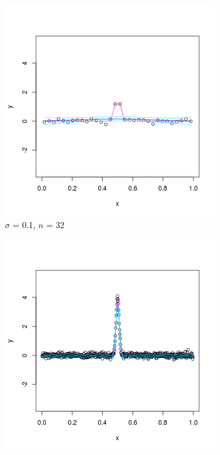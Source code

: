 \documentclass[11pt]{article}
\begin{document}
\begin{homeworkProblem}
    \begin{figure}[!ht]
        \begin{subfigure}{0.5\textwidth}
            \begin{centering}
                \includegraphics[width=\linewidth]{pointy_sig01_n32.png}
                \caption{$\sigma$ = 0.1, $n$ = 32}
            \end{centering}
        \end{subfigure}
        \begin{subfigure}{0.5\textwidth}
            \begin{centering}
                \includegraphics[width=\linewidth]{pointy_sig01_n512.png}

\end{centering}
\end{subfigure}
\end{figure}
\end{homeworkProblem}
\end{document}
